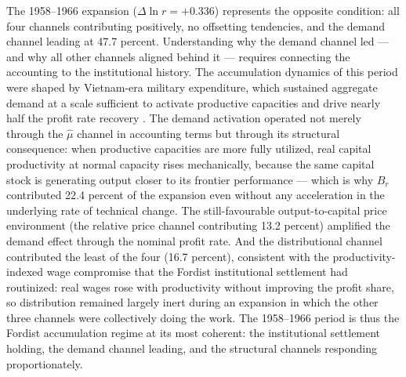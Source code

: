 The 1958--1966 expansion ($\Delta\ln r = +0.336$) represents the
opposite condition: all four channels contributing positively, no
offsetting tendencies, and the demand channel leading at 47.7 percent.
Understanding why the demand channel led --- and why all other channels
aligned behind it --- requires connecting the accounting to the
institutional history. The accumulation dynamics of this period were
shaped by Vietnam-era military expenditure, which sustained aggregate
demand at a scale sufficient to activate productive capacities and drive
nearly half the profit rate recovery \citep{Baker1996}. The demand
activation operated not merely through the $\hat{\mu}$ channel in
accounting terms but through its structural consequence: when productive
capacities are more fully utilized, real capital productivity at normal
capacity rises mechanically, because the same capital stock is generating
output closer to its frontier performance --- which is why $B_{r}$
contributed 22.4 percent of the expansion even without any acceleration
in the underlying rate of technical change. The still-favourable
output-to-capital price environment (the relative price channel
contributing 13.2 percent) amplified the demand effect through the
nominal profit rate. And the distributional channel contributed the
least of the four (16.7 percent), consistent with the
productivity-indexed wage compromise that the Fordist institutional
settlement had routinized: real wages rose with productivity without
improving the profit share, so distribution remained largely inert
during an expansion in which the other three channels were collectively
doing the work. The 1958--1966 period is thus the Fordist accumulation
regime at its most coherent: the institutional settlement holding,
the demand channel leading, and the structural channels responding
proportionately.


